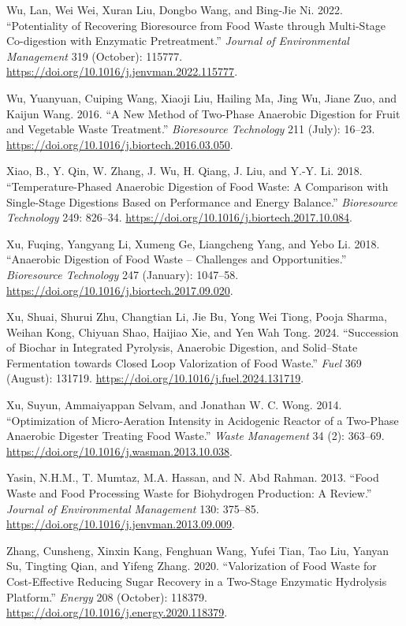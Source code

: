 \documentclass[11pt]{report}
\begin{document}
\begin{hangparas}{1.5em}{1}
\hypertarget{citeproc_bib_item_45}{Wu, Lan, Wei Wei, Xuran Liu, Dongbo Wang, and Bing-Jie Ni. 2022. “Potentiality of Recovering Bioresource from Food Waste through Multi-Stage Co-digestion with Enzymatic Pretreatment.” \textit{Journal of Environmental Management} 319 (October): 115777. \url{https://doi.org/10.1016/j.jenvman.2022.115777}.}

\hypertarget{citeproc_bib_item_46}{Wu, Yuanyuan, Cuiping Wang, Xiaoji Liu, Hailing Ma, Jing Wu, Jiane Zuo, and Kaijun Wang. 2016. “A New Method of Two-Phase Anaerobic Digestion for Fruit and Vegetable Waste Treatment.” \textit{Bioresource Technology} 211 (July): 16–23. \url{https://doi.org/10.1016/j.biortech.2016.03.050}.}

\hypertarget{citeproc_bib_item_47}{Xiao, B., Y. Qin, W. Zhang, J. Wu, H. Qiang, J. Liu, and Y.-Y. Li. 2018. “Temperature-Phased Anaerobic Digestion of Food Waste: A Comparison with Single-Stage Digestions Based on Performance and Energy Balance.” \textit{Bioresource Technology} 249: 826–34. \url{https://doi.org/10.1016/j.biortech.2017.10.084}.}

\hypertarget{citeproc_bib_item_48}{Xu, Fuqing, Yangyang Li, Xumeng Ge, Liangcheng Yang, and Yebo Li. 2018. “Anaerobic Digestion of Food Waste – Challenges and Opportunities.” \textit{Bioresource Technology} 247 (January): 1047–58. \url{https://doi.org/10.1016/j.biortech.2017.09.020}.}

\hypertarget{citeproc_bib_item_49}{Xu, Shuai, Shurui Zhu, Changtian Li, Jie Bu, Yong Wei Tiong, Pooja Sharma, Weihan Kong, Chiyuan Shao, Haijiao Xie, and Yen Wah Tong. 2024. “Succession of Biochar in Integrated Pyrolysis, Anaerobic Digestion, and Solid–State Fermentation towards Closed Loop Valorization of Food Waste.” \textit{Fuel} 369 (August): 131719. \url{https://doi.org/10.1016/j.fuel.2024.131719}.}

\hypertarget{citeproc_bib_item_50}{Xu, Suyun, Ammaiyappan Selvam, and Jonathan W. C. Wong. 2014. “Optimization of Micro-Aeration Intensity in Acidogenic Reactor of a Two-Phase Anaerobic Digester Treating Food Waste.” \textit{Waste Management} 34 (2): 363–69. \url{https://doi.org/10.1016/j.wasman.2013.10.038}.}

\hypertarget{citeproc_bib_item_51}{Yasin, N.H.M., T. Mumtaz, M.A. Hassan, and N. Abd Rahman. 2013. “Food Waste and Food Processing Waste for Biohydrogen Production: A Review.” \textit{Journal of Environmental Management} 130: 375–85. \url{https://doi.org/10.1016/j.jenvman.2013.09.009}.}

\hypertarget{citeproc_bib_item_52}{Zhang, Cunsheng, Xinxin Kang, Fenghuan Wang, Yufei Tian, Tao Liu, Yanyan Su, Tingting Qian, and Yifeng Zhang. 2020. “Valorization of Food Waste for Cost-Effective Reducing Sugar Recovery in a Two-Stage Enzymatic Hydrolysis Platform.” \textit{Energy} 208 (October): 118379. \url{https://doi.org/10.1016/j.energy.2020.118379}.}


\end{hangparas}
\end{document}
